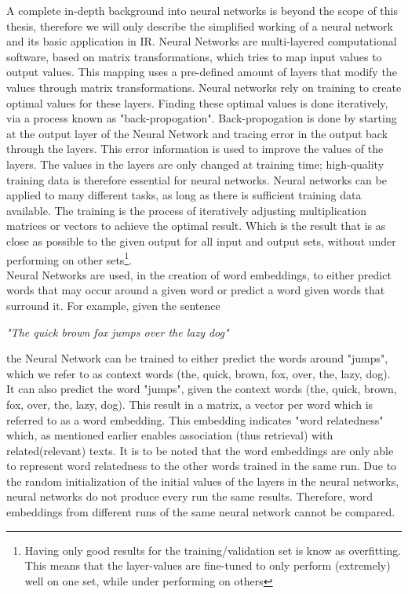 \documentclass[../../Thesis.tex]{subfiles}
\begin{document}
A complete in-depth background into neural networks is beyond the scope of this thesis, therefore we will only describe the simplified working of a neural network and its basic application in IR.
Neural Networks are multi-layered computational software, based on matrix transformations, which tries to map input values to output values. This mapping uses a pre-defined amount of layers that modify the values through matrix transformations. Neural networks rely on training to create optimal values for these layers. Finding these optimal values is done iteratively, via a process known as "back-propogation". Back-propogation is done by starting at the output layer of the Neural Network and tracing error in the output back through the layers. This error information is used to improve the values of the layers. The values in the layers are only changed at training time; high-quality training data is therefore essential for neural networks. Neural networks can be applied to many different tasks, as long as there is sufficient training data available. The training is the process of iteratively adjusting multiplication matrices or vectors to achieve the optimal result. Which is the result that is as close as possible to the given output for all input and output sets, without under performing on other sets\footnote{Having only good results for the training/validation set is know as overfitting. This means that the layer-values are fine-tuned to only perform (extremely) well on one set, while under performing on others}.\\Neural Networks are used, in the creation of word embeddings, to either predict words that may occur around a given word or predict a word given words that surround it. For example, given the sentence\\
\begin{center}
\textit{"The quick brown fox jumps over the lazy dog"}
\end{center}
the Neural Network can be trained to either predict the words around "jumps", which we refer to as context words (the, quick, brown, fox, over, the, lazy, dog). It can also predict the word "jumps", given the context words (the, quick, brown, fox, over, the, lazy, dog). This result in a matrix, a vector per word which is referred to as a word embedding. This embedding indicates "word relatedness" which, as mentioned earlier enables association (thus retrieval) with related(relevant) texts. It is to be noted that the word embeddings are only able to represent word relatedness to the other words trained in the same run. Due to the random initialization of the initial values of the layers in the neural networks, neural networks do not produce every run the same results. Therefore, word embeddings from different runs of the same neural network cannot be compared.
\end{document}
